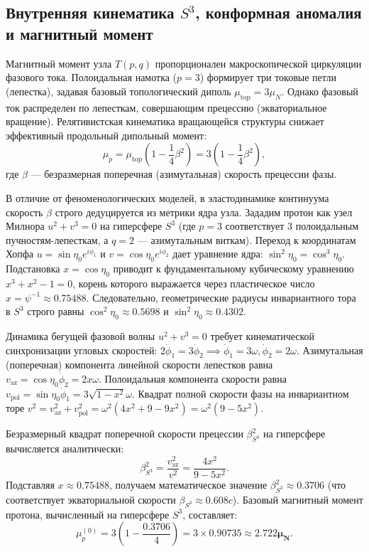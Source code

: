 \documentclass[11pt,a4paper]{article}
\begin{document}
	\subsection{Внутренняя кинематика $S^3$, конформная аномалия и магнитный момент}
	Магнитный момент узла $T(p,q)$ пропорционален макроскопической циркуляции фазового тока. Полоидальная намотка ($p=3$) формирует три токовые петли (лепестка), задавая базовый топологический диполь $\mu_{\text{top}} = 3 \mu_N$. Однако фазовый ток распределен по лепесткам, совершающим прецессию (экваториальное вращение). Релятивистская кинематика вращающейся структуры снижает эффективный продольный дипольный момент:
	\begin{equation}
		\mu_p = \mu_{\text{top}} \left(1 - \frac{1}{4}\beta^2\right) = 3 \left(1 - \frac{1}{4}\beta^2\right),
	\end{equation}
	где $\beta$ — безразмерная поперечная (азимутальная) скорость прецессии фазы.
	
	В отличие от феноменологических моделей, в эластодинамике континуума скорость $\beta$ строго дедуцируется из метрики ядра узла. Зададим протон как узел Милнора $u^2 + v^3 = 0$ на гиперсфере $S^3$ (где $p=3$ соответствует 3 полоидальным пучностям-лепесткам, а $q=2$ — азимутальным виткам). 
	Переход к координатам Хопфа $u = \sin\eta_0 e^{i\phi_1}$ и $v = \cos\eta_0 e^{i\phi_2}$ дает уравнение ядра: $\sin^2\eta_0 = \cos^3\eta_0$. Подстановка $x = \cos\eta_0$ приводит к фундаментальному кубическому уравнению $x^3 + x^2 - 1 = 0$, корень которого выражается через пластическое число $x = \psi^{-1} \approx 0.75488$. Следовательно, геометрические радиусы инвариантного тора в $S^3$ строго равны $\cos^2\eta_0 \approx 0.5698$ и $\sin^2\eta_0 \approx 0.4302$.
	
	Динамика бегущей фазовой волны $u^2 + v^3 = 0$ требует кинематической синхронизации угловых скоростей: $2\dot{\phi}_1 = 3\dot{\phi}_2 \implies \dot{\phi}_1 = 3\omega, \dot{\phi}_2 = 2\omega$.
	Азимутальная (поперечная) компонента линейной скорости лепестков равна $v_{\text{az}} = \cos\eta_0 \dot{\phi}_2 = 2x\omega$.
	Полоидальная компонента скорости равна $v_{\text{pol}} = \sin\eta_0 \dot{\phi}_1 = 3\sqrt{1-x^2}\omega$.
	Квадрат полной скорости фазы на инвариантном торе $v^2 = v_{\text{az}}^2 + v_{\text{pol}}^2 = \omega^2 (4x^2 + 9 - 9x^2) = \omega^2 (9 - 5x^2)$.
	
	Безразмерный квадрат поперечной скорости прецессии $\beta_{S^3}^2$ на гиперсфере вычисляется аналитически:
	\begin{equation}
		\beta_{S^3}^2 = \frac{v_{\text{az}}^2}{v^2} = \frac{4x^2}{9 - 5x^2}.
	\end{equation}
	Подставляя $x \approx 0.75488$, получаем математическое значение $\beta_{S^3}^2 \approx 0.3706$ (что соответствует экваториальной скорости $\beta_{S^3} \approx 0.608 c$).
	Базовый магнитный момент протона, вычисленный на гиперсфере $S^3$, составляет:
	\begin{equation}
		\mu_p^{(0)} = 3 \left(1 - \frac{0.3706}{4}\right) = 3 \times 0.90735 \approx \mathbf{2.722 \mu_N}.
	\end{equation}
	
\end{document}

